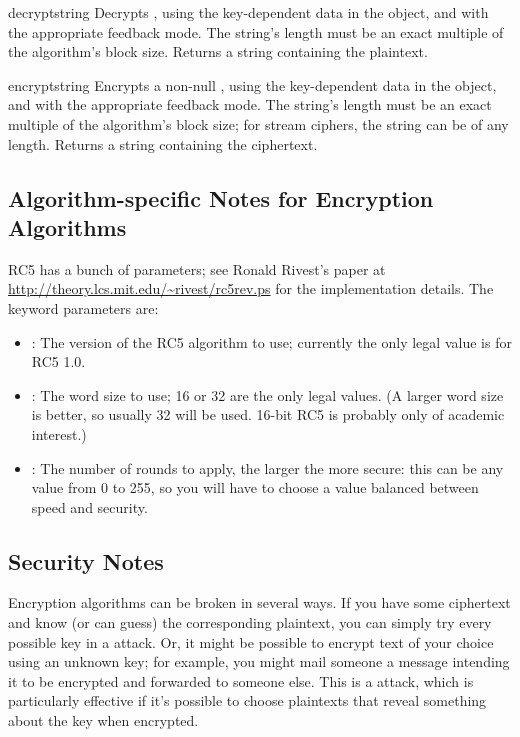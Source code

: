 \documentclass{howto}
\begin{document}
\begin{methoddesc}{decrypt}{string}
Decrypts , using the key-dependent data in the object, and
with the appropriate feedback mode.  The string's length must be an exact
multiple of the algorithm's block size.  Returns a string containing
the plaintext.
\end{methoddesc}

\begin{methoddesc}{encrypt}{string}
Encrypts a non-null , using the key-dependent data in the
object, and with the appropriate feedback mode.  The string's length
must be an exact multiple of the algorithm's block size; for stream
ciphers, the string can be of any length.  Returns a string containing
the ciphertext.
\end{methoddesc}


\subsection{Algorithm-specific Notes for Encryption Algorithms}

RC5 has a bunch of parameters; see Ronald Rivest's paper at
\url{http://theory.lcs.mit.edu/~rivest/rc5rev.ps} for the
implementation details.  The keyword parameters are:

\begin{itemize}
\item {}:
The version
of the RC5 algorithm to use; currently the only legal value is
 for RC5 1.0.  
\item {}:
The word size to use;
16 or 32 are the only legal values.  (A larger word size is better, so
usually 32 will be used.  16-bit RC5 is probably only of academic
interest.)  
\item {}:
The number of rounds to apply, the larger the more secure: this
can be any value from 0 to 255, so you will have to choose a value
balanced between speed and security. 
\end{itemize}


\subsection{Security Notes}
Encryption algorithms can be broken in several ways.  If you have some
ciphertext and know (or can guess) the corresponding plaintext, you can
simply try every possible key in a  attack.  Or, it
might be possible to encrypt text of your choice using an unknown key;
for example, you might mail someone a message intending it to be
encrypted and forwarded to someone else.  This is a
 attack, which is particularly effective if it's
possible to choose plaintexts that reveal something about the key when
encrypted.
\end{document}
